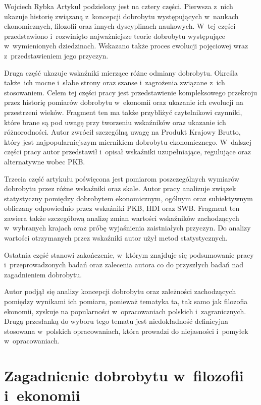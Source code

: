 \begin{artplenv}{Wojciech Rybka}
Artykuł podzielony jest na cztery części. Pierwsza z~nich ukazuje historię związaną z~koncepcji dobrobytu występujących
w~naukach ekonomicznych, filozofii oraz innych dyscyplinach naukowych. W~tej części przedstawiono i~rozwinięto
najważniejsze teorie dobrobytu występujące w~wymienionych dziedzinach. Wskazano także proces ewolucji pojęciowej
wraz z~przedstawieniem jego przyczyn.

Druga część ukazuje wskaźniki mierzące różne odmiany dobrobytu. Określa także~ich mocne i~słabe strony oraz
szanse i~zagrożenia związane z~ich stosowaniem. Celem tej części pracy jest przedstawienie kompleksowego przekroju przez
historię pomiarów dobrobytu w~ekonomii oraz ukazanie ich ewolucji na przestrzeni wieków. Fragment ten ma także
przybliżyć czytelnikowi czynniki, które brane są pod uwagę przy tworzeniu wskaźników oraz ukazanie ich różnorodności.
Autor zwrócił szczególną uwagę na Produkt Krajowy Brutto, który jest najpopularniejszym miernikiem dobrobytu
ekonomicznego. W~dalszej części pracy autor przedstawił i~opisał wskaźniki uzupełniające, regulujące oraz alternatywne
wobec PKB.

Trzecia część artykułu poświęcona jest pomiarom poszczególnych wymiarów dobrobytu przez różne wskaźniki oraz skale.
Autor pracy analizuje związek statystyczny pomiędzy dobrobytem ekonomicznym, ogólnym oraz subiektywnym obliczany
odpowiednio przez wskaźniki PKB, HDI oraz SWB. Fragment ten zawiera także szczegółową analizę zmian wartości wskaźników
zachodzących w~wybranych krajach oraz próbę wyjaśnienia zaistniałych przyczyn. Do analizy wartości otrzymanych przez
wskaźniki autor użył metod statystycznych.

Ostatnia część stanowi zakończenie, w~którym znajduje się podsumowanie pracy  i~przeprowadzonych badań oraz zalecenia
autora co do przyszłych badań nad zagadnieniem dobrobytu.

Autor podjął się analizy koncepcji dobrobytu oraz zależności zachodzących pomiędzy wynikami ich pomiaru, ponieważ
tematyka ta, tak samo jak filozofia ekonomii, zyskuje na popularności w~opracowaniach polskich i~zagranicznych. Drugą
przesłanką do wyboru tego tematu jest niedokładność definicyjna stosowana w~polskich opracowaniach, która prowadzi do
niejasności i~pomyłek w~opracowaniach.

\section{Zagadnienie dobrobytu w~filozofii i~ekonomii}

\end{artplenv}
